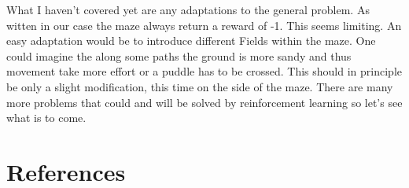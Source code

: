\documentclass[12pt,a4paper]{scrartcl}
\begin{document}
What I haven't covered yet are any adaptations to the general problem. As witten
in our case the maze always return a reward of -1. This seems limiting. An easy
adaptation would be to introduce different Fields within the maze. One could
imagine the along some paths the ground is more sandy and thus movement take
more effort or a puddle has to be crossed. This should in principle be only a
slight modification, this time on the side of the maze. There are many more
problems that could and will be solved by reinforcement learning so let's see
what is to come.


\clearpage
\vfill

\section{References}
\printbibliography
\newpage




% 

% 
% 
% 
\end{document}
